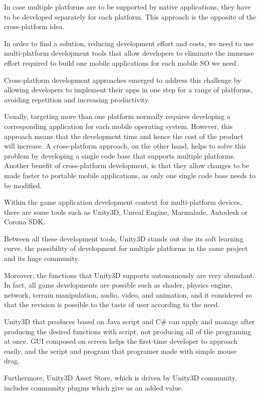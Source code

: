 In case multiple platforms are to be supported by native applications, they have to be developed separately for each platform. This approach is the opposite of the cross-platform idea.~\cite{heneval2012}

In order to find a solution, reducing development effort and costs, we need to use multi-platform development tools that allow developers to eliminate the immense effort required to build one mobile applications for each mobile SO we need.

Cross-platform development approaches emerged to address this challenge by allowing developers to implement their apps in one step for a range of platforms, avoiding repetition and increasing productivity.~\cite{heneval2012}

Usually, targeting more than one platform normally requires developing a corresponding application for each mobile operating system. However, this approach means that the development time and hence the cost of the product will increase. A cross-platform approach, on the other hand, helps to solve this problem by developing a single code base that supports multiple platforms. Another benefit of cross-platform development, is that they allow changes to be made faster to portable mobile applications, as only one single code base needs to be modified.~\cite{chaleval2013}

Within the game application development context for multi-platform devices, there are some tools such as Unity3D, Unreal Engine, Marmalade, Autodesk or Corona SDK.

Between all these development tools, Unity3D stands out due its soft learning curve, the possibility of development for multiple platforms in the same project and its huge community.

Moreover, the functions that Unity3D supports autonomously are very abundant. In fact, all game developments are possible such as shader, physics engine, network, terrain manipulation, audio, video, and animation, and it considered so that the revision is possible to the taste of user according to the need.

Unity3D that produces based on Java script and C\# can apply and manage after producing the desired functions with script, not producing all of the programing at once. GUI composed on screen helps the first-time developer to approach easily, and the script and program that programer made with simple mouse drag.~\cite{kim2014dev}

Furthermore, Unity3D Asset Store, which is driven by Unity3D community, includes community plugins which give us an added value.

